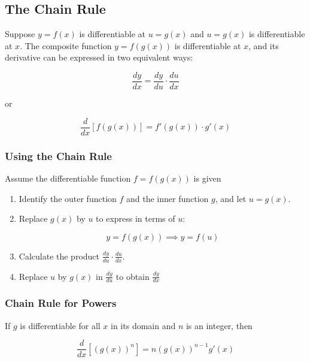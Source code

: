 %
%
%

\subsection{The Chain Rule}
Suppose $y = f(x)$ is differentiable at $u = g(x)$ and $u = g(x)$ is differentiable at $x$. The composite function $y = f(g(x))$ is differentiable at $x$, and its derivative can be expressed in two equivalent ways:

\begin{equation}
    \frac{dy}{dx} = \frac{dy}{du} \cdot \frac{du}{dx}
\end{equation}

or

\begin{equation}
    \frac{d}{dx}\left[ f(g(x)) \right] = f'(g(x)) \cdot g'(x)
\end{equation}

\subsubsection{Using the Chain Rule}
Assume the differentiable function $f = f(g(x))$ is given

\begin{enumerate}
    \item Identify the outer function $f$ and the inner function $g$, and let $u = g(x)$.
    \item Replace $g(x)$ by $u$ to express in terms of $u$:

        \begin{equation}
            y = f(g(x)) \implies y = f(u)
        \end{equation}

    \item Calculate the product $\frac{dy}{du} \cdot \frac{du}{dx}$.
    \item Replace $u$ by $g(x)$ in $\frac{dy}{du}$ to obtain $\frac{dy}{dx}$
\end{enumerate}

\subsubsection{Chain Rule for Powers}
If $g$ is differentiable for all $x$ in its domain and $n$ is an integer, then

\begin{equation}
    \frac{d}{dx}\left[ {(g(x))}^n \right] = {n(g(x))}^{n-1} g'(x) 
\end{equation}
